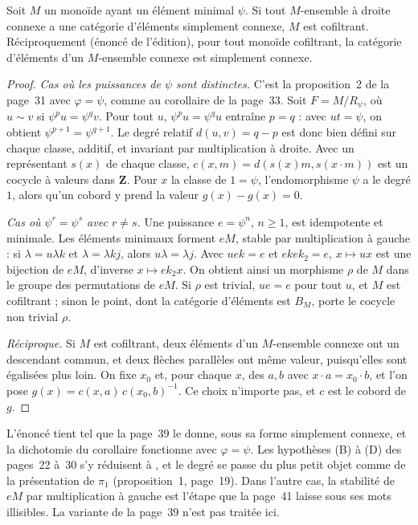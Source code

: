 \begin{encadre}
\begin{theoreme}
Soit $M$ un monoïde ayant un élément minimal $\psi$. Si tout $M$-ensemble à droite connexe a une catégorie d'éléments simplement connexe, $M$ est cofiltrant. Réciproquement (énoncé de l'édition), pour tout monoïde cofiltrant, la catégorie d'éléments d'un $M$-ensemble connexe est simplement connexe.
\end{theoreme}
\end{encadre}

\begin{proof}
\emph{Cas où les puissances de $\psi$ sont distinctes.} C'est la proposition~2 de la page~31 avec $\varphi = \psi$, comme au corollaire de la page~33. Soit $F = M/R_\psi$, où $u \sim v$ si $\psi^p u = \psi^q v$. Pour tout $u$, $\psi^p u = \psi^q u$ entraîne $p = q$ : avec $ut = \psi$, on obtient $\psi^{p+1} = \psi^{q+1}$. Le degré relatif $d(u, v) = q - p$ est donc bien défini sur chaque classe, additif, et invariant par multiplication à droite. Avec un représentant $s(x)$ de chaque classe, $c(x, m) = d(s(x)m, s(x\cdot m))$ est un cocycle à valeurs dans $\mathbf Z$. Pour $x$ la classe de $1 = \psi$, l'endomorphisme $\psi$ a le degré $1$, alors qu'un cobord y prend la valeur $g(x) - g(x) = 0$.

\emph{Cas où $\psi^r = \psi^s$ avec $r \neq s$.} Une puissance $e = \psi^n$, $n \geq 1$, est idempotente et minimale. Les éléments minimaux forment $eM$, stable par multiplication à gauche : si $\lambda = u\lambda k$ et $\lambda = \lambda k j$, alors $u\lambda = \lambda j$. Avec $uek = e$ et $ekek_2 = e$, $x \mapsto ux$ est une bijection de $eM$, d'inverse $x \mapsto ek_2x$. On obtient ainsi un morphisme $\rho$ de $M$ dans le groupe des permutations de $eM$. Si $\rho$ est trivial, $ue = e$ pour tout $u$, et $M$ est cofiltrant ; sinon le point, dont la catégorie d'éléments est $B_M$, porte le cocycle non trivial $\rho$.

\emph{Réciproque.} Si $M$ est cofiltrant, deux éléments d'un $M$-ensemble connexe ont un descendant commun, et deux flèches parallèles ont même valeur, puisqu'elles sont égalisées plus loin. On fixe $x_0$ et, pour chaque $x$, des $a, b$ avec $x\cdot a = x_0\cdot b$, et l'on pose $g(x) = c(x, a)\,c(x_0, b)^{-1}$. Ce choix n'importe pas, et $c$ est le cobord de $g$.
\end{proof}

\begin{remarque}
L'énoncé tient tel que la page~39 le donne, sous sa forme simplement connexe, et la dichotomie du corollaire fonctionne avec $\varphi = \psi$. Les hypothèses (B) à (D) des pages~22 à~30 s'y réduisent à , et le degré se passe du plus petit objet comme de la présentation de $\pi_1$ (proposition~1, page~19). Dans l'autre cas, la stabilité de $eM$ par multiplication à gauche est l'étape que la page~41 laisse sous ses mots illisibles. La variante  de la page~39 n'est pas traitée ici.
\end{remarque}

